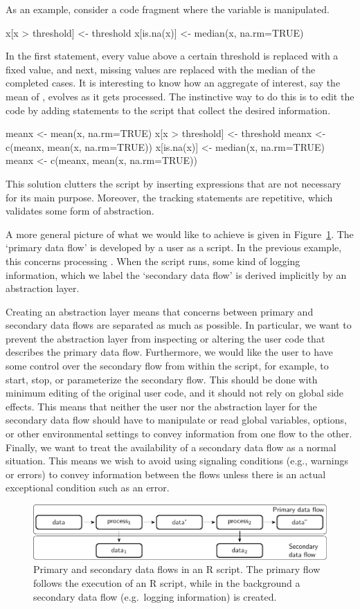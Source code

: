 As an example, consider a code fragment where the variable  is manipulated.
\begin{example}
  x[x > threshold] <- threshold
  x[is.na(x)]  <- median(x, na.rm=TRUE)
\end{example}
In the first statement, every value above a certain threshold is replaced with a
fixed value, and next, missing values are replaced with the median of the
completed cases. It is interesting to know how an aggregate of interest, say
the mean of , evolves as it gets processed. The instinctive way to do
this is to edit the code by adding statements to the script that collect the
desired information.
\begin{example}
  meanx <- mean(x, na.rm=TRUE)
  x[x > threshold] <- threshold
  meanx <- c(meanx, mean(x, na.rm=TRUE))
  x[is.na(x)]  <- median(x, na.rm=TRUE)
  meanx <- c(meanx, mean(x, na.rm=TRUE))
\end{example}
This solution clutters the script by inserting expressions that are not
necessary for its main purpose. Moreover, the tracking statements are
repetitive, which validates some form of abstraction.

A more general picture of what we would like to achieve is given in
Figure~\ref{fig:streams}. The `primary data flow' is developed by a user as a
script. In the previous example, this concerns processing .  When the
script runs, some kind of logging information, which we label the `secondary
data flow' is derived implicitly by an abstraction layer. 

Creating an abstraction layer means that concerns between primary and secondary
data flows are separated as much as possible. In particular, we want to prevent
the abstraction layer from inspecting or altering the user code that describes
the primary data flow. Furthermore, we would like the user to have some control
over the secondary flow from within the script, for example, to start, stop, or
parameterize the secondary flow. This should be done with minimum editing of
the original user code, and it should not rely on global side effects. This
means that neither the user nor the abstraction layer for the secondary data
flow should have to manipulate or read global variables, options, or other
environmental settings to convey information from one flow to the other.
Finally, we want to treat the availability of a secondary data flow as a normal
situation. This means we wish to avoid using signaling conditions (e.g.,
warnings or errors) to convey information between the flows unless there is an
actual exceptional condition such as an error.
%
\begin{figure}[t]
\centering
\includegraphics[width=\textwidth]{fig/streams.pdf}
\caption{Primary and secondary data flows in an R script. The primary flow
follows the execution of an R script, while in the background a secondary data
flow (e.g.\ logging information) is created.}
\label{fig:streams}
\end{figure}


